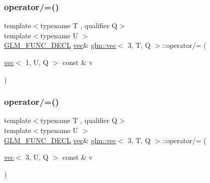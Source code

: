 \subsubsection{\texorpdfstring{operator/=()}{operator/=()}\hspace{0.1cm}{\footnotesize\ttfamily [2/6]}}
{\footnotesize\ttfamily template$<$typename T , qualifier Q$>$ \\
template$<$typename U $>$ \\
\mbox{\hyperlink{setup_8hpp_ab2d052de21a70539923e9bcbf6e83a51}{G\+L\+M\+\_\+\+F\+U\+N\+C\+\_\+\+D\+E\+CL}} \mbox{\hyperlink{structglm_1_1vec}{vec}}\& \mbox{\hyperlink{structglm_1_1vec}{glm\+::vec}}$<$ 3, T, Q $>$\+::operator/= (\begin{DoxyParamCaption}\item[{\mbox{\hyperlink{structglm_1_1vec}{vec}}$<$ 1, U, Q $>$ const \&}]{v }\end{DoxyParamCaption})}

\mbox{\label{structglm_1_1vec_3_013_00_01_t_00_01_q_01_4_ab0b3e69d8f5ae4e3a43203c29c1b9918}} 
\subsubsection{\texorpdfstring{operator/=()}{operator/=()}\hspace{0.1cm}{\footnotesize\ttfamily [3/6]}}
{\footnotesize\ttfamily template$<$typename T , qualifier Q$>$ \\
template$<$typename U $>$ \\
\mbox{\hyperlink{setup_8hpp_ab2d052de21a70539923e9bcbf6e83a51}{G\+L\+M\+\_\+\+F\+U\+N\+C\+\_\+\+D\+E\+CL}} \mbox{\hyperlink{structglm_1_1vec}{vec}}\& \mbox{\hyperlink{structglm_1_1vec}{glm\+::vec}}$<$ 3, T, Q $>$\+::operator/= (\begin{DoxyParamCaption}\item[{\mbox{\hyperlink{structglm_1_1vec}{vec}}$<$ 3, U, Q $>$ const \&}]{v }\end{DoxyParamCaption})}

\mbox{\label{structglm_1_1vec_3_013_00_01_t_00_01_q_01_4_a04e2525807011b5085f89df8dd94ff3d}} 
